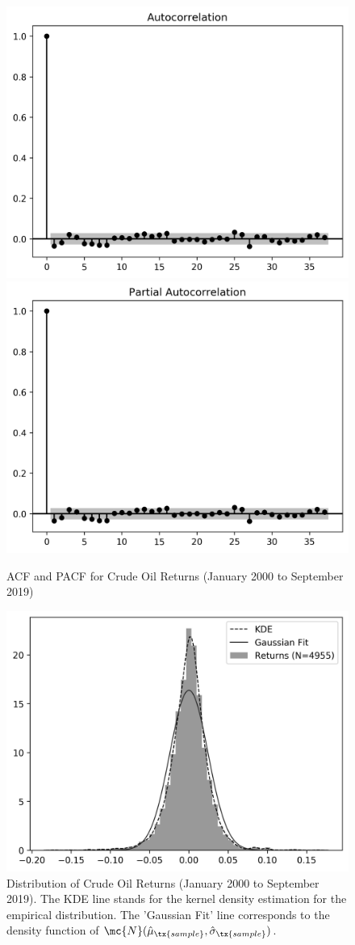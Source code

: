 \documentclass[12pt]{article}
\begin{document}
	\begin{figure}[H]
		\small
		\centering
		\includegraphics[width=0.45\linewidth]{figures/wti_summary/returns_acf.png}
		\includegraphics[width=0.45\linewidth]{figures/wti_summary/returns_pacf.png}
		\caption{ACF and PACF for Crude Oil Returns (January 2000 to September 2019)}
	\end{figure}

	\begin{figure}[H]
		\centering
		\includegraphics{figures/wti_summary/return_hist.png}
		\caption{Distribution of Crude Oil Returns (January 2000 to September 2019). The KDE line stands for the kernel density estimation for the empirical distribution. The 'Gaussian Fit' line corresponds to the density function of $\mc{N}(\hat{\mu}_\tx{sample}, \hat{\sigma}_\tx{sample})$.}
	\end{figure}
\end{document}
